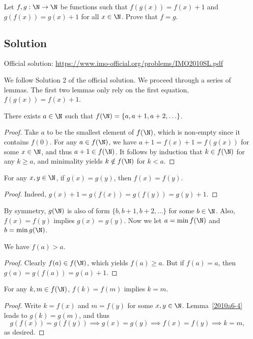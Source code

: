 Let $f, g : \N \to \N$ be functions such that $f(g(x)) = f(x) + 1$ and $g(f(x)) = g(x) + 1$ for all $x \in \N$.
Prove that $f = g$.



\subsection*{Solution}

Official solution: \url{https://www.imo-official.org/problems/IMO2010SL.pdf}

We follow Solution 2 of the official solution.
We proceed through a series of lemmas.
The first two lemmas only rely on the first equation, $f(g(x)) = f(x) + 1$.

\begin{lemma}\label{2010a6-1}
There exists $a \in \N$ such that $f(\N) = \{a, a + 1, a + 2, \ldots\}$.
\end{lemma}
\begin{proof}
Take $a$ to be the smallest element of $f(\N)$, which is non-empty since it contains $f(0)$.
For any $a \in f(\N)$, we have $a + 1 = f(x) + 1 = f(g(x))$ for some $x \in \N$, and thus $a + 1 \in f(\N)$.
It follows by induction that $k \in f(\N)$ for any $k \geq a$, and minimality yields $k \notin f(\N)$ for $k < a$.
\end{proof}

\begin{lemma}\label{2010a6-2}
For any $x, y \in \N$, if $g(x) = g(y)$, then $f(x) = f(y)$.
\end{lemma}
\begin{proof}
Indeed, $g(x) + 1 = g(f(x)) = g(f(y)) = g(y) + 1$.
\end{proof}

By symmetry, $g(\N)$ is also of form $\{b, b + 1, b + 2, \ldots\}$ for some $b \in \N$.
Also, $f(x) = f(y)$ implies $g(x) = g(y)$.
Now we let $a = \min f(\N)$ and $b = \min g(\N)$.

\begin{lemma}\label{2010a6-3}
We have $f(a) > a$.
\end{lemma}
\begin{proof}
Clearly $f(a) \in f(\N)$, which yields $f(a) \geq a$.
But if $f(a) = a$, then $g(a) = g(f(a)) = g(a) + 1$.
\end{proof}

\begin{lemma}\label{2010a6-4}
For any $k, m \in f(\N)$, $f(k) = f(m)$ implies $k = m$.
\end{lemma}
\begin{proof}
Write $k = f(x)$ and $m = f(y)$ for some $x, y \in \N$.
Lemma~\ref{2010a6-4} leads to $g(k) = g(m)$, and thus
\[ g(f(x)) = g(f(y)) \implies g(x) = g(y) \implies f(x) = f(y) \implies k = m, \]
    as desired.
\end{proof}


